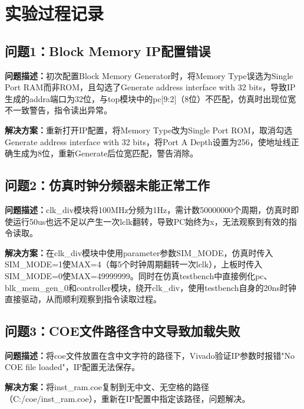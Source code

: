 \section{实验过程记录}

\subsection{问题1：Block Memory IP配置错误}
\textbf{问题描述：}初次配置Block Memory Generator时，将Memory Type误选为Single Port RAM而非ROM，且勾选了Generate address interface with 32 bits，导致IP生成的addra端口为32位，与top模块中的pc[9:2]（8位）不匹配，仿真时出现位宽不一致警告，指令读出异常。

\textbf{解决方案：}重新打开IP配置，将Memory Type改为Single Port ROM，取消勾选Generate address interface with 32 bits，将Port A Depth设置为256，使地址线正确生成为8位，重新Generate后位宽匹配，警告消除。

\subsection{问题2：仿真时钟分频器未能正常工作}
\textbf{问题描述：}clk\_div模块将100MHz分频为1Hz，需计数50000000个周期，仿真时即使运行50us也远不足以产生一次lclk翻转，导致PC始终为x，无法观察到有效的指令读取。

\textbf{解决方案：}在clk\_div模块中使用parameter参数SIM\_MODE，仿真时传入SIM\_MODE=1使MAX=4（每5个时钟周期翻转一次lclk），上板时传入SIM\_MODE=0使MAX=49999999。同时在仿真testbench中直接例化pc、blk\_mem\_gen\_0和controller模块，绕开clk\_div，使用testbench自身的20ns时钟直接驱动，从而顺利观察到指令读取过程。

\subsection{问题3：COE文件路径含中文导致加载失败}
\textbf{问题描述：}将coe文件放置在含中文字符的路径下，Vivado验证IP参数时报错"No COE file loaded"，IP配置无法保存。

\textbf{解决方案：}将inst\_ram.coe复制到无中文、无空格的路径（C:/coe/inst\_ram.coe），重新在IP配置中指定该路径，问题解决。
